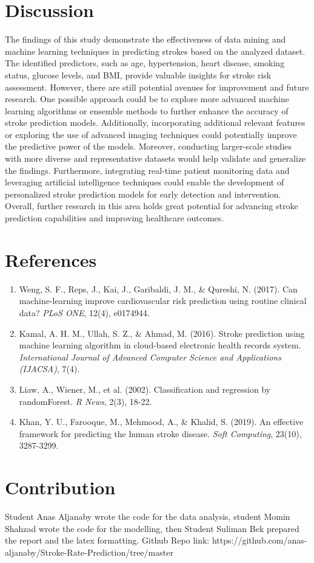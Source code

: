 \documentclass{article}
\begin{document}
\section{Discussion}

 The findings of this study demonstrate the effectiveness of data mining and machine learning techniques in predicting strokes based on the analyzed dataset. The identified predictors, such as age, hypertension, heart disease, smoking status, glucose levels, and BMI, provide valuable insights for stroke risk assessment. However, there are still potential avenues for improvement and future research. One possible approach could be to explore more advanced machine learning algorithms or ensemble methods to further enhance the accuracy of stroke prediction models. Additionally, incorporating additional relevant features or exploring the use of advanced imaging techniques could potentially improve the predictive power of the models. Moreover, conducting larger-scale studies with more diverse and representative datasets would help validate and generalize the findings. Furthermore, integrating real-time patient monitoring data and leveraging artificial intelligence techniques could enable the development of personalized stroke prediction models for early detection and intervention. Overall, further research in this area holds great potential for advancing stroke prediction capabilities and improving healthcare outcomes.

\section{References}

\begin{enumerate}
\item Weng, S. F., Reps, J., Kai, J., Garibaldi, J. M., \& Qureshi, N. (2017).
Can machine-learning improve cardiovascular risk prediction using routine clinical data?
{\em PLoS ONE}, 12(4), e0174944.

\item Kamal, A. H. M., Ullah, S. Z., \& Ahmad, M. (2016).
Stroke prediction using machine learning algorithm in cloud-based electronic health records system.
{\em International Journal of Advanced Computer Science and Applications (IJACSA)}, 7(4).

\item Liaw, A., Wiener, M., et al. (2002).
Classification and regression by randomForest.
{\em R News}, 2(3), 18-22.

\item Khan, Y. U., Farooque, M., Mehmood, A., \& Khalid, S. (2019).
An effective framework for predicting the human stroke disease.
{\em Soft Computing}, 23(10), 3287-3299.
\end{enumerate}



\section{Contribution}

Student Anas Aljanaby wrote the code for the data analysis, student Momin Shahzad wrote the code for the modelling, then Student Suliman Bek prepared the report and the latex formatting. Github Repo link: https://github.com/anas-aljanaby/Stroke-Rate-Prediction/tree/master
\end{document}

